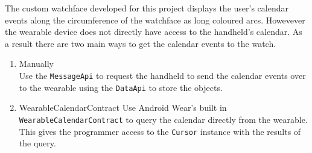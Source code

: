 The custom watchface developed for this project displays the user's calendar
events along the circumference of the watchface as long coloured arcs. Howevever
the wearable device does not directly have access to the handheld's calendar.
As a result there are two main ways to get the calendar events to the watch.
\begin{enumerate}
\item Manually\\
    Use the \texttt{MessageApi} to request the handheld to send the calendar
    events over to the wearable using the \texttt{DataApi} to store the objects.
\item WearableCalendarContract
    Use Android Wear's built in \texttt{WearableCalendarContract} to query the
    calendar directly from the wearable. This gives the programmer access to the
    \texttt{Cursor} instance with the results of the query.
\end{enumerate}


